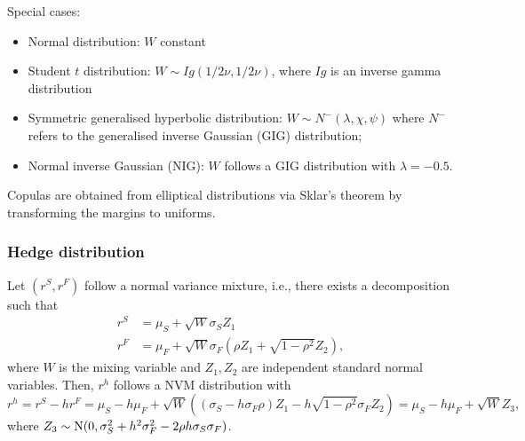 Special cases:
\begin{itemize}
\item Normal distribution: $W$ constant
\item Student $t$ distribution: $W\sim \displaystyle Ig(1/2 \nu, 1/2
  \nu)$, where $Ig$ is an inverse gamma distribution
\item Symmetric generalised hyperbolic distribution: $W\sim
  N^{-}(\lambda, \chi, \psi)$ where $N^{-}$ refers to
  the generalised inverse Gaussian (GIG) distribution;
\item Normal inverse Gaussian (NIG): $W$ follows a GIG distribution
  with $\lambda=-0.5$.  
\end{itemize}

Copulas are obtained from elliptical distributions via Sklar's theorem
by transforming the margins to uniforms. 

\subsubsection*{Hedge distribution}
\label{sec:hedge-distribution-1}

Let $(r^S, r^F)$ follow a normal variance mixture, i.e., there exists a
decomposition such that
\begin{align*}
  r^S &=\mu_S + \sqrt{W} \sigma_S Z_1\\
  r^F &= \mu_F + \sqrt{W} \sigma_F (\rho Z_1 + \sqrt{1-\rho^2} Z_2),
\end{align*}
where $W$ is the mixing variable and $Z_1, Z_2$ are independent
standard normal variables. Then, $r^h$ follows a NVM distribution with
\begin{equation*}
  r^h = r^S - h r^F =  \mu_S - h \mu_F + \sqrt{W}
  \left((\sigma_S-h\sigma_F\rho)Z_1 -h \sqrt{1-\rho^2} 
    \sigma_F Z_2\right) = \mu_S - h \mu_F + \sqrt{W} Z_3,
\end{equation*}
where $Z_3\sim {\rm N}(0, \sigma_S^2 + h^2\sigma_F^2 - 2\rho
h\sigma_S \sigma_F)$. 

